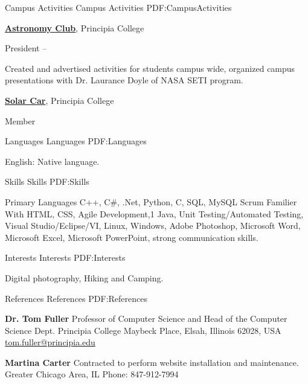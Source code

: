 \documentclass[a4paper,MMMyyyy,nonstopmode]{simpleresumecv}
\begin{document}
\begin{Body}



\Section
{Campus Activities}
{Campus Activities}
{PDF:CampusActivities}

\Entry
\href{http://www.example.com/my-club}
{\textbf{Astronomy Club}},
Principia College

\Gap
\BulletItem
President
\hfill
{} --
\begin{Detail}
\SubBulletItem
Created and advertised activities for students campus wide, organized campus presentations with Dr. Laurance Doyle of NASA SETI program.

\Entry
\Gap
\href{https://www.principiasolarcar.com/}
{\textbf{Solar Car}},
Principia College

\BulletItem
Member
\end{Detail}


\Section
{Languages}
{Languages}
{PDF:Languages}

\BulletItem
English: Native language.


\Section
{Skills}
{Skills}
{PDF:Skills}

\Entry
\BulletItem Primary Languages
\SubBulletItem
C++,
C\#,
.Net,
Python,
C,
SQL, MySQL
Scrum
\Gap
\BulletItem Familier With
\SubBulletItem
HTML, CSS,
Agile Development,1
Java,
Unit Testing/Automated Testing,
Visual Studio/Eclipse/VI,
Linux, Windows,
Adobe Photoshop,
Microsoft Word,
Microsoft Excel,
Microsoft PowerPoint,
strong communication skills.


\Section
{Interests}
{Interests}
{PDF:Interests}

\Entry
Digital photography,
Hiking and Camping.


\Section
{References}
{References}
{PDF:References}

\BulletItem
\textbf{Dr. Tom Fuller}
\newline
Professor of Computer Science and Head of the Computer Science Dept.
\newline
Principia College
 Maybeck Place, Elsah, Illinois 62028, USA
\newline
\href{mailto:tom.fuller@principia.edu}
{tom.fuller@principia.edu}


\BulletItem
\textbf{Martina Carter}
\newline
Contracted to perform website installation and maintenance. 
\newline
Greater Chicago Area, IL
\newline
{Phone: 847-912-7994}

\end{Body}
\end{document}
